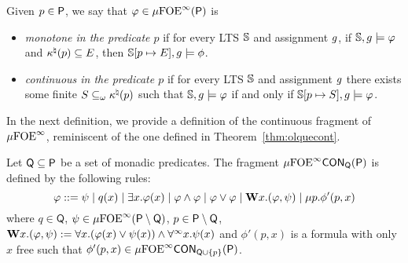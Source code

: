 %
%
\begin{definition}
Given $p \in \mathsf{P}$, we say that $\varphi \in \mu{\ensuremath{\mathrm{FOE}}}^\infty(\mathsf{P})$ is
\begin{itemize}
\item \emph{monotone in the predicate $p$} if for every LTS $\mathbb{S}$ and assignment $g$, if $\mathbb{S}, g \models \varphi$ and $\kappa^\natural(p) \subseteq E$, then $\mathbb{S}[p \mapsto E], g\models \phi$.

\item \emph{continuous in the predicate $p$} if for every LTS $\mathbb{S}$ and assignment $g$ there exists some finite $S \subseteq_\omega \kappa^\natural(p)$ such that $\mathbb{S}, g \models \varphi$ if and only if $\mathbb{S}[p \mapsto S], g \models \varphi$.
\end{itemize}
\end{definition}

In the next definition, we provide a definition of the continuous fragment of $\mu{\ensuremath{\mathrm{FOE}}}^\infty$, reminiscent of the one defined in Theorem~\ref{thm:olquecont}.
\begin{definition}
Let $\mathsf{Q}\subseteq \mathsf{P}$ be a set of monadic predicates. The fragment $\mu{\ensuremath{\mathrm{FOE}}}^\infty\mathsf{CON}_{\mathsf{Q}}(\mathsf{P})$ is defined by the following rules:
$$
\varphi ::= \psi \mid q(x) \mid \exists x.\varphi(x) \mid \varphi \land \varphi \mid \varphi \lor \varphi \mid \mathbf{W} x.(\varphi,\psi) \mid \mu p. \phi'(p, x)
$$
where $q \in \mathsf{Q}$, $\psi \in \mu{\ensuremath{\mathrm{FOE}}}^\infty(\mathsf{P}\setminus \mathsf{Q})$, $p \in \mathsf{P} \setminus \mathsf{Q}$, $\mathbf{W} x.(\varphi,\psi) := \forall x.(\varphi(x) \lor \psi(x)) \land \forall^\infty x.\psi(x)$ and $\phi'(p,x)$ is a formula with only $x$ free such that $\phi'(p,x) \in \mu{\ensuremath{\mathrm{FOE}}}^\infty\mathsf{CON}_{\mathsf{Q} \cup\{p\}}(\mathsf{P})$.

\end{definition}


